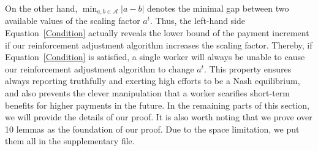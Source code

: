 \documentclass{article}
\begin{document}
On the other hand, ${\min}_{a,b\in\mathcal{A}}|a-b|$ denotes the minimal gap between two available values of the scaling factor $a^t$.
Thus, the left-hand side Equation~\ref{Condition} actually reveals the lower bound of the payment increment if our reinforcement adjustment algorithm increases the scaling factor.
Thereby, if Equation~\ref{Condition} is satisfied, a single worker will always be unable to cause our reinforcement adjustment algorithm to change $a^t$.
This property ensures always reporting truthfully and exerting high efforts to be a Nash equilibrium, and also prevents the clever manipulation that a worker scarifies short-term benefits for higher payments in the future.
In the remaining parts of this section, we will provide the details of our proof.
It is also worth noting that we prove over 10 lemmas as the foundation of our proof.
Due to the space limitation, we put them all in the supplementary file.
\end{document}

